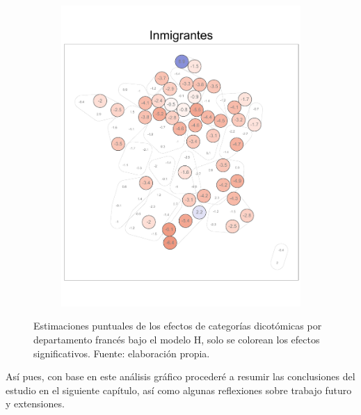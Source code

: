 \begin{figure}
\begin{subfigure}{0.275\textwidth}
	\includegraphics[width = \textwidth]{Figs/Efectos/Dorling_Efectos_Inm_Modelo_H}
	\end{subfigure}
	\caption{Estimaciones puntuales de los efectos de categorías dicotómicas por departamento francés bajo el modelo H, solo se colorean los efectos significativos. Fuente: elaboración propia.}
	\label{fig:Dorling_Efectos_Dicotom}
\end{figure}

Así pues, con base en este análisis gráfico procederé a resumir las conclusiones del estudio en el siguiente capítulo, así como algunas reflexiones sobre trabajo futuro y extensiones. 
